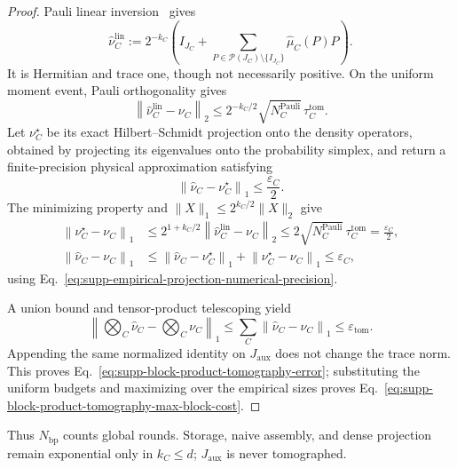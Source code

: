 \documentclass[
  aps,
  prx,
  reprint,
  superscriptaddress,
  amsmath,
  amssymb,
  nofootinbib,
  longbibliography
]{revtex4-2}
\newcommand{\Pc}{\mathcal{P}}
\begin{document}
\begin{proof}
Pauli linear inversion~\cite{AltepeterJamesKwiat2004} gives
\begin{equation}
\widehat\nu_C^{\mathrm{lin}}
:=
2^{-k_C}
\left(
I_{J_C}
+
\sum_{P\in\Pc(J_C)\setminus\{I_{J_C}\}}
\widehat\mu_C(P)P
\right).
\end{equation}
It is Hermitian and trace one, though not necessarily positive.  On the
uniform moment event, Pauli orthogonality gives
\begin{equation}
\left\|\widehat\nu_C^{\mathrm{lin}}-\nu_C\right\|_2
\le2^{-k_C/2}\sqrt{N_C^{\mathrm{Pauli}}}\,\tau_C^{\mathrm{tom}}.
\end{equation}
Let $\nu_C^\star$ be its exact Hilbert--Schmidt projection onto the density
operators, obtained by projecting its eigenvalues onto the probability
simplex, and return a finite-precision physical approximation satisfying
\begin{equation}
\left\|\widehat\nu_C-\nu_C^\star\right\|_1
\le
\frac{\varepsilon_C}{2}.
\label{eq:supp-empirical-projection-numerical-precision}
\end{equation}
The minimizing property and $\|X\|_1\le2^{k_C/2}\|X\|_2$ give
\begin{align}
\left\|\nu_C^\star-\nu_C\right\|_1
&\le
2^{1+k_C/2}
\left\|\widehat\nu_C^{\mathrm{lin}}-\nu_C\right\|_2
\le
2\sqrt{N_C^{\mathrm{Pauli}}}\,\tau_C^{\mathrm{tom}}
=
\frac{\varepsilon_C}{2},\\
\left\|\widehat\nu_C-\nu_C\right\|_1
&\le
\left\|\widehat\nu_C-\nu_C^\star\right\|_1
+\left\|\nu_C^\star-\nu_C\right\|_1
\le
\varepsilon_C,
\end{align}
using Eq.~\eqref{eq:supp-empirical-projection-numerical-precision}.

A union bound and tensor-product telescoping yield
\begin{equation}
\left\|\bigotimes_C\widehat\nu_C-\bigotimes_C\nu_C\right\|_1
\le
\sum_C\left\|\widehat\nu_C-\nu_C\right\|_1
\le
\varepsilon_{\mathrm{tom}}.
\end{equation}
Appending the same normalized identity on $J_{\mathrm{aux}}$ does not
change the trace norm.  This proves
Eq.~\eqref{eq:supp-block-product-tomography-error}; substituting the
uniform budgets and maximizing over the empirical sizes proves
Eq.~\eqref{eq:supp-block-product-tomography-max-block-cost}.
\end{proof}

Thus $N_{\mathrm{bp}}$ counts global rounds.  Storage, naive assembly, and
dense projection remain exponential only in $k_C\le d$;
$J_{\mathrm{aux}}$ is never tomographed.
\end{document}
